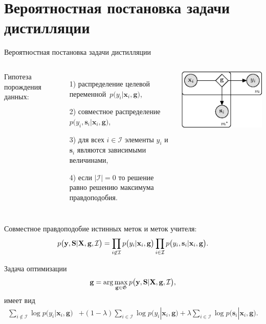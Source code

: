 \documentclass[10pt,pdf,hyperref={unicode}]{beamer}
\begin{document}
\section{Вероятностная постановка задачи дистилляции}
\begin{frame}{Вероятностная постановка задачи дистилляции}
\bigskip
\begin{columns}
Гипотеза порождения данных:
\begin{enumerate}
	\item[1)] распределение целевой переменной~$p\bigr(y_i|\mathbf{x}_i, \mathbf{g}\bigr)$,
	\item[2)] совместное распределение~$p\bigr(y_i, \mathbf{s}_i|\mathbf{x}_i, \mathbf{g}\bigr)$,
	\item[3)] для всех $i \in \mathcal{I}$ элементы $y_i$ и $\mathbf{s}_i$ являются зависимыми величинами,
	\item[4)] если $|\mathcal{I}|=0$ то решение равно решению максимума правдоподобия.
\end{enumerate}
\includegraphics[width=\textwidth]{figures/proba_model}
\end{columns}

\bigskip
Совместное правдоподобие истинных меток и меток учителя:
\[
\setlength\abovedisplayskip{0pt}
p\bigr(\mathbf{y}, \mathbf{S}|\mathbf{X}, \mathbf{g}, \mathcal{I}\bigr)=\prod_{i\not\in \mathcal{I}}p\bigr(y_i|\mathbf{x}_i, \mathbf{g}\bigr)\prod_{i\in \mathcal{I}}p\bigr(y_i, \mathbf{s}_i|\mathbf{x}_i, \mathbf{g}\bigr).
\setlength\belowdisplayskip{0pt}
\]

Задача оптимизации
\[
\setlength\abovedisplayskip{0pt}
\mathbf{g} = \arg\max_{\mathbf{g} \in \mathfrak{G}} p\bigr(\mathbf{y},  \mathbf{S}|\mathbf{X}, \mathbf{g}, \mathcal{I}\bigr),
\setlength\belowdisplayskip{0pt}
\]
имеет вид
\[
\begin{aligned}
\sum_{i\not\in \mathcal{I}}\log p\bigr(y_i|\mathbf{x}_i, \mathbf{g}\bigr) &+ \left(1-\lambda\right)\sum_{i\in \mathcal{I}}\log p\bigr(y_i|\mathbf{x}_i, \mathbf{g}\bigr) + \lambda\sum_{i\in \mathcal{I}}\log p\bigr(\mathbf{s}_i|\mathbf{x}_i, \mathbf{g}\bigr).
\end{aligned}
\]
\end{frame}
\end{document}
